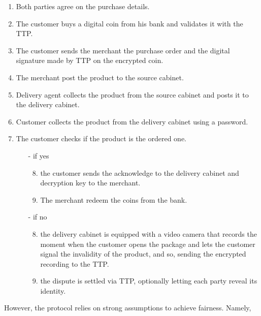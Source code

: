 \documentclass{ieeeaccess}
\begin{document}
\begin{enumerate}
    \item Both parties agree on the purchase details.
    \item The customer buys a digital coin from his bank and validates it with the TTP.
    \item The customer sends the merchant the purchase order and the digital signature made by TTP on the encrypted coin.
    \item The merchant post the product to the source cabinet.
    \item Delivery agent collects the product from the source cabinet and posts it to the delivery cabinet.
    \item Customer collects the product from the delivery cabinet using a password.
    \item The customer checks if the product is the ordered one.
    \begin{itemize}
    \item[-] if yes 
        \begin{enumerate}
        \setcounter{enumii}{7}
        \item the customer sends the acknowledge to the delivery cabinet and decryption key to the merchant.
        \item The merchant redeem the coins from the bank.
        \end{enumerate}
    \item[-] if no
        \begin{enumerate}
        \setcounter{enumii}{7}
        \item the delivery cabinet is equipped with a video camera that records the moment when the customer opens the package and lets the customer signal the invalidity of the product, and so, sending the encrypted recording to the TTP. 
        \item the dispute is settled via TTP, optionally letting each party reveal its identity.
    \end{enumerate}
    \end{itemize}
\end{enumerate}
\endgroup

However, the protocol relies on strong assumptions to achieve fairness.
Namely,
\end{document}
